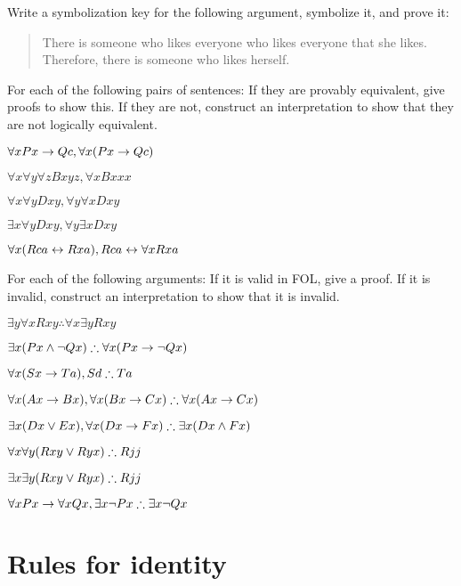 \problempart
\label{pr.likes}
Write a symbolization key for the following argument, symbolize it, and prove it:
\begin{quote}
There is someone who likes everyone who likes everyone that she likes. Therefore, there is someone who likes herself.
\end{quote}

\problempart
\label{pr.FOLequivornot}
For each of the following pairs of sentences: If they are provably equivalent, give proofs to show this. If they are not, construct an interpretation to show that they are not logically equivalent.
\begin{earg}
\item $\forall x Px \rightarrow Qc, \forall x (Px \rightarrow Qc)$
\item $\forall x\forall y \forall z Bxyz, \forall x Bxxx$
\item $\forall x\forall y Dxy, \forall y\forall x Dxy$
\item $\exists x\forall y Dxy, \forall y\exists x Dxy$
\item $\forall x (Rca \leftrightarrow Rxa), Rca \leftrightarrow \forall x Rxa$
\end{earg}

\problempart
\label{pr.FOLvalidornot}
For each of the following arguments: If it is valid in FOL, give a proof. If it is invalid, construct an interpretation to show that it is invalid.
\begin{earg}
\item $\exists y\forall x Rxy \therefore \forall x\exists y Rxy$
\item $\exists x(Px \wedge \neg Qx) \therefore \forall x(Px \rightarrow \neg Qx)$
\item $\forall x(Sx \rightarrow Ta), Sd \therefore Ta$
\item $\forall x(Ax\rightarrow Bx), \forall x(Bx \rightarrow Cx) \therefore \forall x(Ax \rightarrow Cx)$
\item $\exists x(Dx \vee Ex), \forall x(Dx \rightarrow Fx) \therefore \exists x(Dx \wedge Fx)$
\item $\forall x\forall y(Rxy \vee Ryx) \therefore Rjj$
\item $\exists x\exists y(Rxy \vee Ryx) \therefore Rjj$
\item $\forall x Px \rightarrow \forall x Qx, \exists x \neg Px \therefore \exists x \neg Qx$
\end{earg}


\section{Rules for identity}

